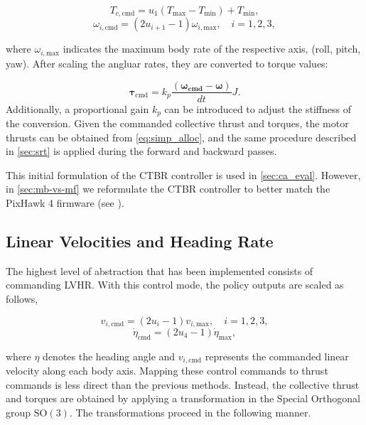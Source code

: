 \begin{equation}
    T_{c, \text{cmd}} = u_1  (T_{\text{max}} - T_{\text{min}}) + T_{\text{min}}, 
\end{equation}
\begin{equation}\label{omega-cmd}
    \omega_{i, \text{cmd}} = (2u_{i+1} - 1)  \omega_{i, \text{max}}, \quad i = 1, 2, 3,
\end{equation}

\noindent where $\omega_{i, \text{max}}$ indicates the maximum body rate of the respective axis, (roll, pitch, yaw).
After scaling the angluar rates, they are converted to torque values:

\begin{equation}
    \boldsymbol{\tau}_\text{cmd} = k_p \frac{(\boldsymbol{\omega_{\text{cmd}}} - \boldsymbol{\omega})}{dt} J.    
\end{equation}
Additionally, a proportional gain $k_p$ can be introduced to adjust the stiffness of the conversion.
Given the commanded collective thrust and torques, the motor thrusts can be obtained from \eqref{eq:simp_alloc}, and the same procedure described in \autoref{sec:srt} is applied during the forward and backward passes.

This initial formulation of the \ac{CTBR} controller is used in \autoref{sec:ca_eval}. However, in \autoref{sec:mb-vs-mf} we reformulate the \ac{CTBR} controller to better match the PixHawk 4 firmware (see ).

\subsection{Linear Velocities and Heading Rate}\label{subsec:lvhr}

The highest level of abstraction that has been implemented consists of commanding \ac{LVHR}. With this control mode, the policy outputs are scaled as follows,

\begin{equation}\label{eq:geo_vel}
    v_{i, \text{cmd}} = (2u_{i} - 1)  v_{i, \text{max}}, \quad i = 1, 2, 3,
\end{equation}
\begin{equation}\label{eq:geo_omega}
    \dot{\eta}_{\text{cmd}} = (2u_{4} - 1)  \dot{\eta}_{ \text{max}},
\end{equation}

\noindent where $\eta$ denotes the heading angle and $v_{i,\text{cmd}}$ represents the commanded linear velocity along each body axis. 
Mapping these control commands to thrust commands is less direct than the previous methods. 
Instead, the collective thrust and torques are obtained by applying a transformation in the Special Orthogonal group $\mathrm{SO}(3)$.
The transformations proceed in the following manner.

